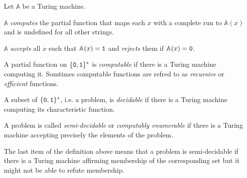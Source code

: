 \begin{defin}
    Let $\mathbb A$ be a Turing machine.

    \begin{thmlist}
        \item
          $\mathbb A$ \emph{computes} the partial function that maps each
          $x$ with a complete run to $\mathbb A(x)$ and is undefined for all
          other strings.
        \item
          $\mathbb A$ \emph{accepts} all $x$ such that
          $\mathbb A(x) = \mathtt 1$ and \emph{rejects} them if
          $\mathbb A(x) = \mathtt 0$.
        \item
          A partial function on $\lbrace \mathtt 0, \mathtt 1 \rbrace^*$ is
          \emph{computable} if there is a Turing machine computing it. Somtimes computable functions are refred to as \emph{recursive} or \emph{efficient} functions.
        \item
          A subset of $\lbrace \mathtt 0, \mathtt 1 \rbrace^*$, i.e. a
          problem, is \emph{decidable} if there is a Turing machine computing
          its characteristic function.
        \item
          A problem is called \emph{semi-decidable} or \emph{computably
          enumerable} if there is a Turing machine accepting precisely the
          elements of the problem.
    \end{thmlist}
\end{defin}

The last item of the definition above means that a problem is
semi-decidable if there is a Turing machine affirming membership of the
corresponding set but it might not be able to refute membership.

